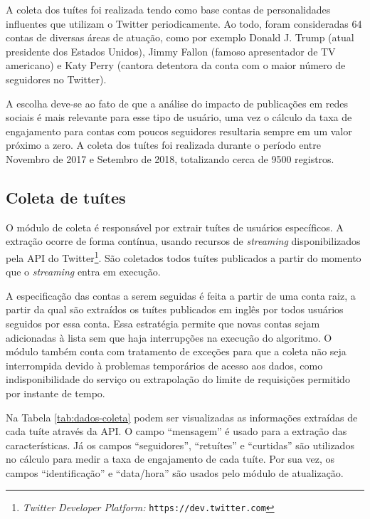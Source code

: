 \documentclass[oneside,openright,12pt]{ufsm_2015} %
\begin{document}
    \par A coleta dos tuítes foi realizada tendo como base contas de personalidades influentes que utilizam o Twitter periodicamente. Ao todo, foram consideradas 64 contas de diversas áreas de atuação, como por exemplo Donald J. Trump (atual presidente dos Estados Unidos), Jimmy Fallon (famoso apresentador de TV americano) e Katy Perry (cantora detentora da conta com o maior número de seguidores no Twitter). 
    
    \par A escolha deve-se ao fato de que a análise do impacto de publicações em redes sociais é mais relevante para esse tipo de usuário, uma vez o cálculo da taxa de engajamento para contas com poucos seguidores resultaria sempre em um valor próximo a zero. A coleta dos tuítes foi realizada durante o período entre Novembro de 2017 e Setembro de 2018, totalizando cerca de 9500 registros.

\subsection{Coleta de tuítes}

    \par O módulo de coleta é responsável por extrair tuítes de usuários específicos. A extração ocorre de forma contínua, usando recursos de \textit{streaming} disponibilizados pela API do Twitter\footnote{\textit{Twitter Developer Platform:} \texttt{https://dev.twitter.com}}. São coletados todos tuítes publicados a partir do momento que o \textit{streaming} entra em execução.
    
    \par A especificação das contas a serem seguidas é feita a partir de uma conta raiz, a partir da qual são extraídos os tuítes publicados em inglês por todos usuários seguidos por essa conta. Essa estratégia permite que novas contas sejam adicionadas à lista sem que haja interrupções na execução do algoritmo. O módulo também conta com tratamento de exceções para que a coleta não seja interrompida devido à problemas temporários de acesso aos dados, como indisponibilidade do serviço ou extrapolação do limite de requisições permitido por instante de tempo.
    
    \par Na Tabela \ref{tab:dados-coleta} podem ser visualizadas as informações extraídas de cada tuíte através da API. O campo ``mensagem'' é usado para a extração das características. Já os campos ``seguidores'', ``retuítes'' e ``curtidas'' são utilizados no cálculo para medir a taxa de engajamento de cada tuíte. Por sua vez, os campos ``identificação'' e ``data/hora'' são usados pelo módulo de atualização.
    
\end{document}
